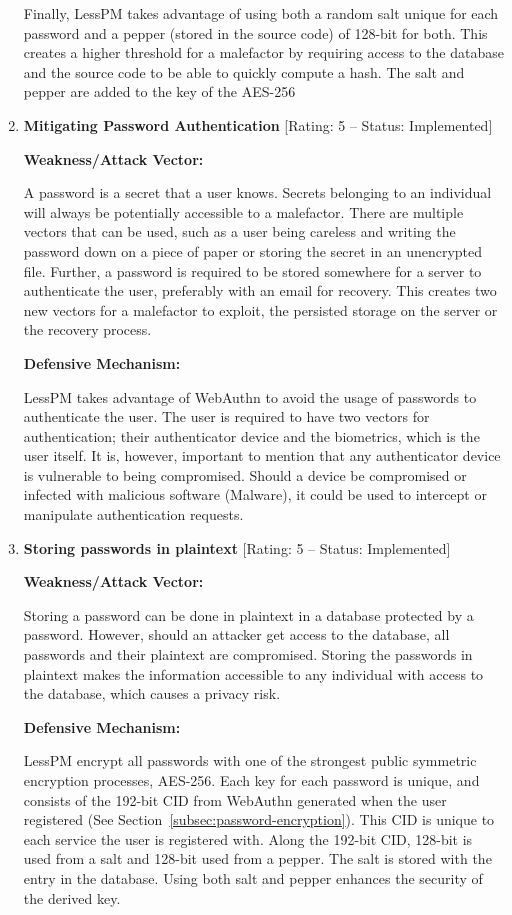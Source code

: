 \begin{enumerate}[label=$\blacktriangleright$]
  Finally, LessPM takes advantage of using both a random salt unique for each
  password and a pepper (stored in the source code) of 128-bit for both.
  This creates a higher threshold for a malefactor by requiring access to the
  database and the source code to be able to quickly compute a hash.
  The salt and pepper are added to the key of the AES-256

  \item \textbf{Mitigating Password Authentication} [Rating: 5 -- Status:
  Implemented]

  \textbf{Weakness/Attack Vector:}

  A password is a secret that a user knows.
  Secrets belonging to an individual will always be potentially accessible to
  a malefactor.
  There are multiple vectors that can be used, such as a user being careless
  and writing the password down on a piece of paper or storing the secret in an
  unencrypted file.
  Further, a password is required to be stored somewhere for a server to
  authenticate the user, preferably with an email for recovery.
  This creates two new vectors for a malefactor to exploit, the persisted
  storage on the server or the recovery process.

  \textbf{Defensive Mechanism:}

  LessPM takes advantage of WebAuthn to avoid the usage of passwords to
  authenticate the user.
  The user is required to have two vectors for authentication; their
  authenticator device and the biometrics, which is the user itself.
  It is, however, important to mention that any authenticator device is
  vulnerable to being compromised.
  Should a device be compromised or infected with malicious software (Malware),
  it could be used to intercept or manipulate authentication requests.

  \item \textbf{Storing passwords in plaintext}
  [Rating: 5 -- Status: Implemented]

  \textbf{Weakness/Attack Vector:}

  Storing a password can be done in plaintext in a database protected by a
  password.
  However, should an attacker get access to the database, all passwords and
  their plaintext are compromised.
  Storing the passwords in plaintext makes the information accessible to any
  individual with access to the database, which causes a privacy risk.

  \textbf{Defensive Mechanism:}

  LessPM encrypt all passwords with one of the strongest public symmetric
  encryption processes, AES-256.
  Each key for each password is unique, and consists of the 192-bit CID from
  WebAuthn generated when the user registered (See
  Section~\ref{subsec:password-encryption}).
  This CID is unique to each service the user is registered with.
  Along the 192-bit CID, 128-bit is used from a salt and 128-bit used from a
  pepper.
  The salt is stored with the entry in the database.
  Using both salt and pepper enhances the security of the derived key.


\end{enumerate}
